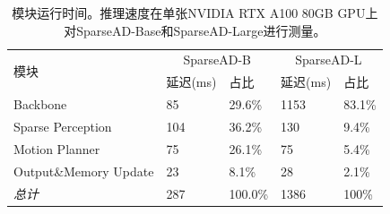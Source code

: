 \begin{table}[t]
		\caption{模块运行时间。推理速度在单张NVIDIA RTX A100 80GB GPU上对SparseAD-Base和SparseAD-Large进行测量。}
		\begin{center}
			\tiny
			\vspace{-10pt}
			{
				\begin{tabular}{p{4cm}|p{2cm}<{\centering}p{2cm}<{\centering}|p{2cm}<{\centering}p{2cm}<{\centering}}
					\toprule
					\multirow{2}{*}{模块}&
	                \multicolumn{2}{c|}{SparseAD-B} &
					\multicolumn{2}{c}{SparseAD-L}  \\
					& 延迟(ms) & 占比 & 延迟(ms) & 占比\\
					\midrule
					Backbone& 85& 29.6\%&1153&83.1\%\\
					Sparse Perception&104& 36.2\%&130&9.4\%\\
					Motion Planner&75&26.1\%&75&5.4\%\\
					Output\&Memory Update&23 &8.1\%&28 & 2.1\%\\
					\midrule
					\textit{总计}&287 & 100.0\% & 1386 & 100\%\\
					\bottomrule
				\end{tabular}%
			}
		\end{center}
		\label{tab:runtime}
	\end{table}